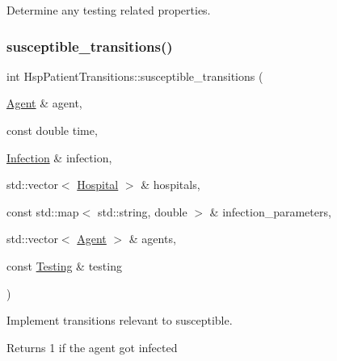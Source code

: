 Determine any testing related properties. 

\mbox{\label{classHspPatientTransitions_aaa062d18f7667c56f54de552f9641b8d}} 
\subsubsection{\texorpdfstring{susceptible\+\_\+transitions()}{susceptible\_transitions()}}
{\footnotesize\ttfamily int Hsp\+Patient\+Transitions\+::susceptible\+\_\+transitions (\begin{DoxyParamCaption}\item[{\hyperlink{classAgent}{Agent} \&}]{agent,  }\item[{const double}]{time,  }\item[{\hyperlink{classInfection}{Infection} \&}]{infection,  }\item[{std\+::vector$<$ \hyperlink{classHospital}{Hospital} $>$ \&}]{hospitals,  }\item[{const std\+::map$<$ std\+::string, double $>$ \&}]{infection\+\_\+parameters,  }\item[{std\+::vector$<$ \hyperlink{classAgent}{Agent} $>$ \&}]{agents,  }\item[{const \hyperlink{classTesting}{Testing} \&}]{testing }\end{DoxyParamCaption})}



Implement transitions relevant to susceptible. 

Returns 1 if the agent got infected \mbox{\label{classHspPatientTransitions_aaeb2177a0e70028f01c092c0bf48863c}} 
